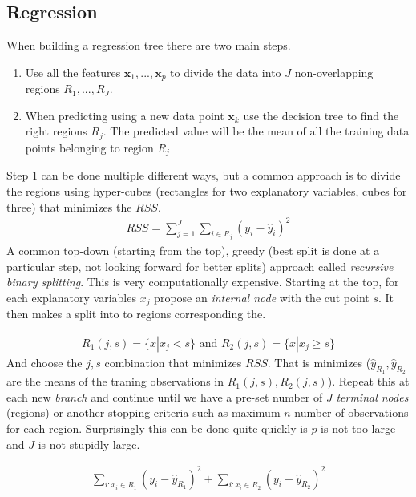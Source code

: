 \documentclass{article}
\renewcommand{\vec}[1]{\mathbf{#1}} %
\begin{document}
\subsection{Regression}
When building a regression tree there are two main steps.

\begin{enumerate}
    \item Use all the features $\vec{x}_1, ... , \vec{x}_p$ to divide the data into $J$ non-overlapping regions $R_1 , ... , R_J$.
    \item When predicting using a new data point $\vec{x}_k$ use the decision tree to find the right regions $R_j$. The predicted value will be the mean of all the training data points belonging to region $R_j$
\end{enumerate}

Step 1 can be done multiple different ways, but a common approach is to divide the regions using hyper-cubes (rectangles for two explanatory variables, cubes for three) that minimizes the $RSS$.
\begin{align*}
    RSS = \sum_{j=1}^{J} \sum_{i \in R_j} (y_i - \hat{y}_i)^2
\end{align*}
A common top-down (starting from the top), greedy (best split is done at a particular step, not looking forward for better splits) approach called \textit{recursive binary splitting}. This is very computationally expensive. Starting at the top, for each explanatory variables $x_j$  propose an \textit{internal node} with the cut point $s$. It then makes a split into to regions corresponding the.

\begin{align*}
    R_1(j,s) = \{ x | x_j < s \} \text{ and } R_2(j,s) = \{ x | x_j \geq s \}
\end{align*}
And choose the $j,s$ combination that minimizes $RSS$. That is minimizes ($\hat{y}_{R_1}, \hat{y}_{R_2}$ are the means of the traning observations in $R_1(j,s), R_2(j,s)$). Repeat this at each new \textit{branch} and continue until we have a pre-set number of $J$ \textit{terminal nodes} (regions) or another stopping criteria such as maximum $n$ number of observations for each region. Surprisingly this can be done quite quickly is $p$ is not too large and $J$ is not stupidly large.

\begin{align*}
    \sum_{i: x_i \in R_1} (y_i -\hat{y}_{R_1})^2 + \sum_{i: x_i \in R_2} (y_i -\hat{y}_{R_2})^2 
\end{align*}
\end{document}
